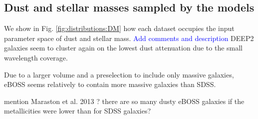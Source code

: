 \documentclass[onecolumn]{aa}
\begin{document}

\subsection{Dust and stellar masses sampled by the models}
\label{subsec:res:dust:mass}
We show in Fig. \ref{fig:distributions:DM} how each dataset occupies the input parameter space of dust and stellar mass. 
\textcolor{blue}{Add comments and description}
DEEP2 galaxies seem to cluster again on the lowest dust attenuation due to the small wavelength coverage.

Due to a larger volume and a preselection to include only massive galaxies, eBOSS seems relatively to contain more massive galaxies than SDSS.

\textcolor{b}{mention Maraston et al. 2013 ?}
\textcolor{b}{ there are so many dusty eBOSS galaxies if the metallicities were lower than for SDSS galaxies? }
\end{document}
